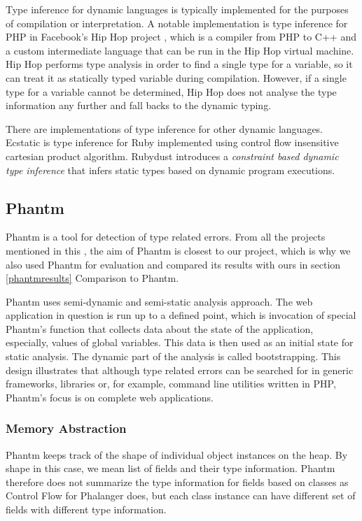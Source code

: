     Type inference for dynamic languages is typically implemented 
    for the purposes of compilation or interpretation. A notable implementation 
    is type inference for PHP in Facebook's Hip Hop project \cite{zhao2012hiphop}, 
    which is a compiler from PHP to C++ and a custom intermediate language 
    that can be run in the Hip Hop virtual machine. Hip Hop performs type 
    analysis in order to find a single type for a variable, so it can treat 
    it as statically typed variable during compilation. However, if a single 
    type for a variable cannot be determined, Hip Hop does not analyse 
    the type information any further and fall backs to the dynamic typing.    
        
    There are implementations of type inference for other dynamic languages. 
    Ecstatic \cite{madsen2007ecstatic} is type inference for Ruby 
    implemented using control flow insensitive cartesian product algorithm. 
    Rubydust \cite{an2011dynamic} introduces a \emph{constraint based dynamic 
    type inference} that infers static types based on dynamic program 
    executions.

    \subsection{Phantm}
    
    Phantm \cite{kneuss2010phantm} is a tool for detection of type related 
    errors. From all the projects mentioned in this \wchapter{}, the aim of 
    Phantm is closest to our project, which is why we also used Phantm 
    for evaluation and compared its results with ours in 
    section \ref{phantmresults} Comparison to Phantm.
    
    Phantm uses semi-dynamic and semi-static analysis approach. The web 
    application in question is run up to a defined point, which is invocation 
    of special Phantm's function that collects data about the state of the application, 
    especially, values of global variables. This data is then used as an initial 
    state for static analysis. The dynamic part of the analysis is called bootstrapping. 
    This design illustrates that although type related errors can be searched for 
    in generic frameworks, libraries or, for example, command line utilities 
    written in PHP, Phantm's focus is on complete web applications.
    
    \subsubsection*{Memory Abstraction}
    Phantm keeps track of the shape of individual object instances on the heap. 
    By shape in this case, we mean list of fields and their type information. 
    Phantm therefore does not summarize the type information for fields based 
    on classes as Control Flow for Phalanger does, but each class instance 
    can have different set of fields with different type information.
    
